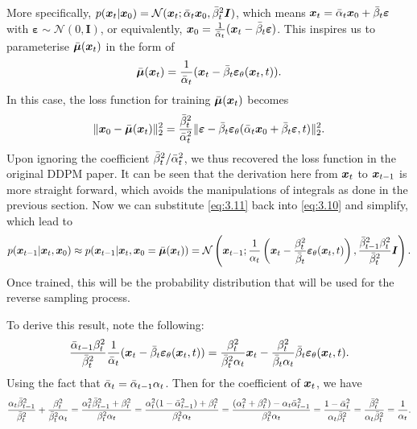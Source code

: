 More specifically, $p(\bm{x}_{t}|\bm{x}_0)=\mathcal{N}(\bm{x}_{t};\bar{\alpha}_t\bm{x}_0,\bar{\beta}_t^2\bm{I})$, which means $\bm{x}_{t}=\bar{\alpha}_t\bm{x}_0+\bar{\beta}_t\bm{\varepsilon}$ with $\bm{\varepsilon}\sim\mathcal{N}(0,\bm{I})$, or equivalently, $\bm{x}_0=\frac{1}{\bar{\alpha}_t}(\bm{x}_{t}-\bar{\beta}_t\bm{\varepsilon})$. This inspires us to parameterise $\bar{\bm{\mu}}(\bm{x}_{t})$ in the form of 
\begin{equation}
    \label{eq:3.11}
    \bar{\bm{\mu}}(\bm{x}_{t})=\frac{1}{\bar{\alpha}_t}(\bm{x}_{t}-\bar{\beta}_t\bm{\varepsilon}_\theta(\bm{x}_{t},t)).
\end{equation}
In this case, the loss function for training $\bar{\bm{\mu}}(\bm{x}_{t})$ becomes
\begin{equation}
    \label{eq:3.12}
    \|\bm{x}_0-\bar{\bm{\mu}}(\bm{x}_{t})\|_2^2=\frac{\bar{\beta}_t^2}{\bar{\alpha}_t^2}\|\bm{\varepsilon}- \bar{\beta}_t\bm{\varepsilon}_\theta( \bar{\alpha}_t \bm{x}_0+\bar{\beta}_t\bm{\varepsilon}  ,t) \|_2^2.
\end{equation}
Upon ignoring the coefficient $\bar{\beta}_t^2/\bar{\alpha}_t^2$, we thus recovered the loss function in the original DDPM paper. It can be seen that the derivation here from $\bm{x}_{t}$ to $\bm{x}_{t-1}$ is more straight forward, which avoids the manipulations of integrals as done in the previous section. Now we can substitute \cref{eq:3.11} back into  \cref{eq:3.10} and simplify, which lead to
\textcolor{red}{
\begin{equation}
    \label{eq:3.13}
    p(\bm{x}_{t-1}|\bm{x}_{t},\bm{x}_0)\approx p(\bm{x}_{t-1}|\bm{x}_{t},\bm{x}_0=\bar{\bm{\mu}}(\bm{x}_{t}))=\mathcal{N}\left(\bm{x}_{t-1}; \frac{1}{\alpha_t}\left(\bm{x}_{t}-\frac{\beta_t^2}{\bar{\beta}_t} \bm{\varepsilon}_\theta(\bm{x}_{t},t)\right),\frac{\bar{\beta}_{t-1}^2\beta_t^2}{\bar{\beta}_t^2}\bm{I}  \right).
\end{equation}}
Once trained, this will be the probability distribution that will be used for the reverse sampling process. 
\begin{myquote}
    \footnotesize{
    To derive this result, note the following:
\begin{equation*}
    \frac{\bar{\alpha}_{t-1}\beta_t^2}{\bar{\beta}_t^2}\frac{1}{\bar{\alpha}_t}(\bm{x}_{t}-\bar{\beta}_t\bm{\varepsilon}_\theta(\bm{x}_{t},t)) = \frac{\beta_t^2}{\bar{\beta}_t^2\alpha_t}\bm{x}_{t}- \frac{\beta_t^2}{\bar{\beta}_t\alpha_t}\bar{\beta}_t\bm{\varepsilon}_\theta(\bm{x}_{t},t).
\end{equation*}
Using the fact that $\bar{\alpha}_t=\bar{\alpha}_{t-1}\alpha_t$. Then for the coefficient of $\bm{x}_{t}$, we have
\begin{equation*}
    \frac{\alpha_t\bar{\beta}_{t-1}^2}{\bar{\beta}_t^2}+\frac{\beta_t^2}{\bar{\beta}_t^2\alpha_t}=\frac{\alpha_t^2\bar{\beta}_{t-1}^2+\beta_t^2}{\beta_t^2\alpha_t}=\frac{\alpha_t^2(1-\bar{\alpha}_{t-1}^2)+\beta_t^2}{\beta_t^2\alpha_t}=\frac{(\alpha_t^2+\beta_t^2)-\alpha_t\bar{\alpha}_{t-1}^2}{\beta_t^2\alpha_t}=\frac{1-\bar{\alpha}_t^2}{\alpha_t\bar{\beta}_t^2}=\frac{\bar{\beta}_t^2}{\alpha_t\bar{\beta}_t^2}=\frac{1}{\alpha_t}.
\end{equation*}
    }
\end{myquote}
